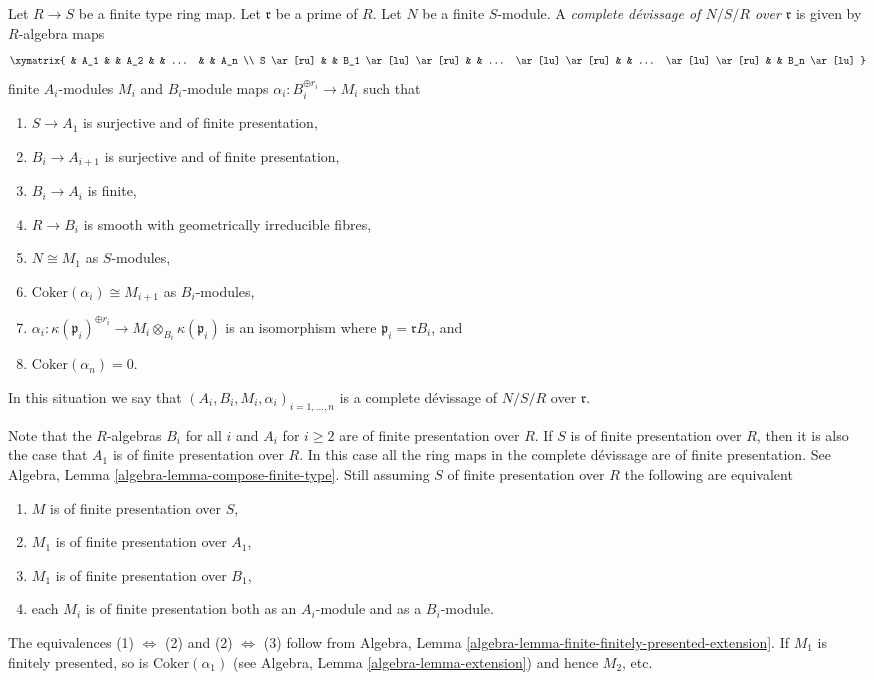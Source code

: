 \begin{definition}
\label{definition-complete-devissage-algebra}
Let $R \to S$ be a finite type ring map.
Let $\mathfrak r$ be a prime of $R$.
Let $N$ be a finite $S$-module.
A {\it complete d\'evissage of $N/S/R$ over $\mathfrak r$}
is given by $R$-algebra maps
$$
\xymatrix{
& A_1 & & A_2 & & ... & & A_n \\
S \ar[ru] & & B_1 \ar[lu] \ar[ru] & & ... \ar[lu] \ar[ru] & &
... \ar[lu] \ar[ru] & & B_n \ar[lu]
}
$$
finite $A_i$-modules $M_i$ and $B_i$-module maps
$\alpha_i : B_i^{\oplus r_i} \to M_i$ such that
\begin{enumerate}
\item $S \to A_1$ is surjective and of finite presentation,
\item $B_i \to A_{i + 1}$ is surjective and of finite presentation,
\item $B_i \to A_i$ is finite,
\item $R \to B_i$ is smooth with geometrically irreducible fibres,
\item $N \cong M_1$ as $S$-modules,
\item $\text{Coker}(\alpha_i) \cong M_{i + 1}$ as $B_i$-modules,
\item $\alpha_i : \kappa(\mathfrak p_i)^{\oplus r_i}
\to M_i \otimes_{B_i} \kappa(\mathfrak p_i)$ is an isomorphism
where $\mathfrak p_i = \mathfrak rB_i$, and
\item $\text{Coker}(\alpha_n) = 0$.
\end{enumerate}
In this situation we say that
$(A_i, B_i, M_i, \alpha_i)_{i = 1, \ldots, n}$
is a complete d\'evissage of $N/S/R$ over $\mathfrak r$.
\end{definition}

\begin{remark}
\label{remark-finite-presentation}
Note that the $R$-algebras $B_i$ for all $i$ and $A_i$ for $i \geq 2$
are of finite presentation over $R$. If $S$ is of finite presentation over
$R$, then it is also the case that $A_1$ is of finite presentation over
$R$. In this case all the ring maps in the complete d\'evissage are of
finite presentation. See
Algebra, Lemma \ref{algebra-lemma-compose-finite-type}.
Still assuming $S$ of finite presentation over $R$
the following are equivalent
\begin{enumerate}
\item $M$ is of finite presentation over $S$,
\item $M_1$ is of finite presentation over $A_1$,
\item $M_1$ is of finite presentation over $B_1$,
\item each $M_i$ is of finite presentation both as an $A_i$-module
and as a $B_i$-module.
\end{enumerate}
The equivalences (1) $\Leftrightarrow$ (2) and (2) $\Leftrightarrow$ (3)
follow from
Algebra, Lemma \ref{algebra-lemma-finite-finitely-presented-extension}.
If $M_1$ is finitely presented, so is $\text{Coker}(\alpha_1)$ (see
Algebra, Lemma \ref{algebra-lemma-extension})
and hence $M_2$, etc.
\end{remark}

